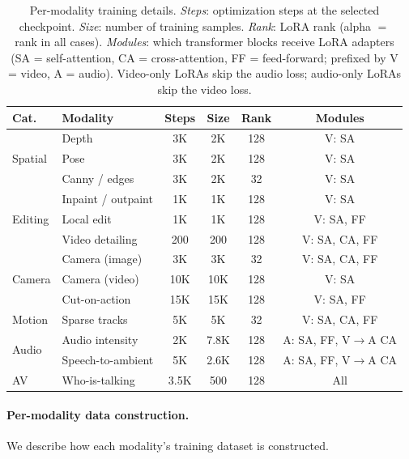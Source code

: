 \begin{table}[!ht]
\centering
\caption{Per-modality training details. \emph{Steps}: optimization steps at the selected checkpoint. \emph{Size}: number of training samples. \emph{Rank}: LoRA rank (alpha $=$ rank in all cases). \emph{Modules}: which transformer blocks receive LoRA adapters (SA = self-attention, CA = cross-attention, FF = feed-forward; prefixed by V = video, A = audio). Video-only LoRAs skip the audio loss; audio-only LoRAs skip the video loss.}
\label{tab:training_details}
\setlength{\tabcolsep}{2.5pt}
\footnotesize
\begin{tabular}{@{}llcccc@{}}
\toprule
Cat. & Modality & Steps & Size & Rank & Modules \\
\midrule
\multirow{3}{*}{Spatial}
& Depth          & 3K  & 2K   & 128 & V: SA \\
& Pose           & 3K  & 2K   & 128 & V: SA \\
& Canny / edges  & 3K  & 2K   &  32 & V: SA \\
\midrule
\multirow{3}{*}{Editing}
& Inpaint / outpaint     & 1K  & 1K  & 128 & V: SA \\
& Local edit             & 1K  & 1K  & 128 & V: SA, FF \\
& Video detailing        & 200 & 200 & 128 & V: SA, CA, FF \\
\midrule
\multirow{3}{*}{Camera}
& Camera (image)  & 3K  & 3K  &  32 & V: SA, CA, FF \\
& Camera (video)  & 10K & 10K & 128 & V: SA \\
& Cut-on-action   & 15K & 15K & 128 & V: SA, FF \\
\midrule
Motion & Sparse tracks & 5K & 5K & 32 & V: SA, CA, FF \\
\midrule
\multirow{2}{*}{Audio}
& Audio intensity    & 2K   & 7.8K & 128 & A: SA, FF, V\!$\to$\!A CA \\
& Speech-to-ambient  & 5K   & 2.6K & 128 & A: SA, FF, V\!$\to$\!A CA \\
\midrule
AV & Who-is-talking & 3.5K & 500 & 128 & All \\
\bottomrule
\end{tabular}
\end{table}



\paragraph{Per-modality data construction.}
We describe how each modality's training dataset is constructed.

